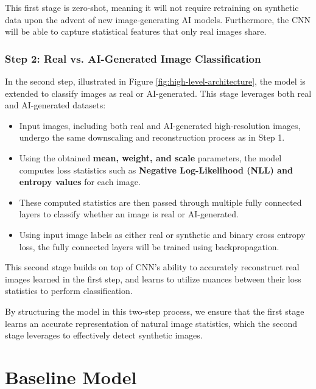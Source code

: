 \documentclass{article} %
\begin{document}
This first stage is zero-shot, meaning it will not require retraining on synthetic data upon the advent of new image-generating AI models. Furthermore, the CNN will be able to capture statistical features that only real images share. 

\subsubsection{Step 2: Real vs. AI-Generated Image Classification}
In the second step, illustrated in Figure \ref{fig:high-level-architecture}, the model is extended to classify images as real or AI-generated. This stage leverages both real and AI-generated datasets:
\begin{itemize}
    \item Input images, including both real and AI-generated high-resolution images, undergo the same downscaling and reconstruction process as in Step 1.
    \item Using the obtained \textbf{mean, weight, and scale} parameters, the model computes loss statistics such as \textbf{Negative Log-Likelihood (NLL) and entropy values} for each image.
    \item These computed statistics are then passed through multiple fully connected layers to classify whether an image is real or AI-generated.
    \item Using input image labels as either real or synthetic and binary cross entropy loss, the fully connected layers will be trained using backpropagation.
\end{itemize}

This second stage builds on top of CNN's ability to accurately reconstruct real images learned in the first step, and learns to utilize nuances between their loss statistics to perform classification. 

By structuring the model in this two-step process, we ensure that the first stage learns an accurate representation of natural image statistics, which the second stage leverages to effectively detect synthetic images.

\section{Baseline Model}
\label{baseline}
\end{document}
